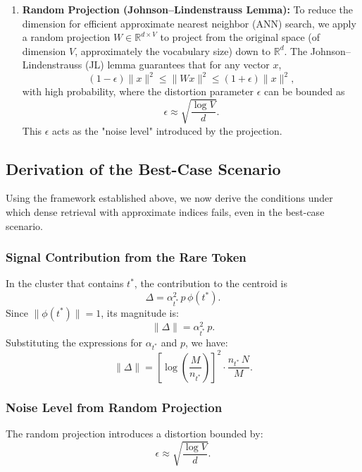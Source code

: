 \documentclass[manuscript]{acmart}
\begin{document}
\begin{enumerate}
\item \textbf{Random Projection (Johnson–Lindenstrauss Lemma):} To reduce the dimension for efficient approximate nearest neighbor (ANN) search, we apply a random projection $W\in \mathbb{R}^{d\times V}$ to project from the original space (of dimension $V$, approximately the vocabulary size) down to $\mathbb{R}^d$. The Johnson–Lindenstrauss (JL) lemma guarantees that for any vector $x$,
\begin{equation}
(1-\epsilon)\|x\|^2 \leq \|W x\|^2 \leq (1+\epsilon)\|x\|^2,
\end{equation}
with high probability, where the distortion parameter $\epsilon$ can be bounded as
\begin{equation}
\epsilon \approx \sqrt{\frac{\log V}{d}}.
\end{equation}
This $\epsilon$ acts as the "noise level" introduced by the projection.
\end{enumerate}

\subsection{Derivation of the Best-Case Scenario}
Using the framework established above, we now derive the conditions under which dense retrieval with approximate indices fails, even in the best-case scenario.

\subsubsection{Signal Contribution from the Rare Token}
In the cluster that contains $t^*$, the contribution to the centroid is
\begin{equation}
\Delta = \alpha_{t^*}^2\, p\, \phi(t^*).
\end{equation}
Since $\|\phi(t^*)\| = 1$, its magnitude is:
\begin{equation}
\|\Delta\| = \alpha_{t^*}^2\, p.
\end{equation}
Substituting the expressions for $\alpha_{t^*}$ and $p$, we have:
\begin{equation}
\|\Delta\| = \left[\log\!\left(\frac{M}{n_{t^*}}\right)\right]^2 \cdot \frac{n_{t^*}\, N}{M}.
\end{equation}

\subsubsection{Noise Level from Random Projection}
The random projection introduces a distortion bounded by:
\begin{equation} \label{eq:jl-error}
\epsilon \approx \sqrt{\frac{\log V}{d}}.
\end{equation}
\end{document}
